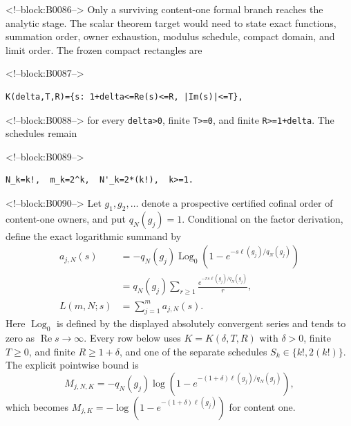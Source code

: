 \documentclass[11pt]{article}
\begin{document}
<!--block:B0086-->
Only a surviving content-one formal branch reaches the analytic stage.
The scalar theorem target would need to state exact functions, summation
order, owner exhaustion, modulus schedule, compact domain, and limit
order. The frozen compact rectangles are

<!--block:B0087-->
\begin{verbatim}
K(delta,T,R)={s: 1+delta<=Re(s)<=R, |Im(s)|<=T},
\end{verbatim}

<!--block:B0088-->
for every \texttt{delta\textgreater{}0}, finite
\texttt{T\textgreater{}=0}, and finite \texttt{R\textgreater{}=1+delta}.
The schedules remain

<!--block:B0089-->
\begin{verbatim}
N_k=k!,  m_k=2^k,  N'_k=2*(k!),  k>=1.
\end{verbatim}

<!--block:B0090-->
Let \(g_1,g_2,\ldots\) denote a prospective certified cofinal order of
content-one owners, and put \(q_N(g_j)=1\).  Conditional on the factor derivation,
define the exact logarithmic summand by
\[
 \begin{aligned}
 a_{j,N}(s)
 &=-q_N(g_j)\operatorname{Log}_0
 \!\left(1-e^{-s\ell(g_j)/q_N(g_j)}\right)\\
 &=q_N(g_j)\sum_{r\geq1}
 \frac{e^{-rs\ell(g_j)/q_N(g_j)}}{r},\\
 L(m,N;s)&=\sum_{j=1}^m a_{j,N}(s).
 \end{aligned}
\]
Here \(\operatorname{Log}_0\) is defined by the displayed absolutely convergent
series and tends to zero as \(\operatorname{Re}s\to\infty\).  Every row below
uses
\(K=K(\delta,T,R)\) with \(\delta>0\), finite \(T\geq0\), and finite
\(R\geq1+\delta\), and one of the separate schedules
\(S_k\in\{k!,2(k!)\}\).  The explicit pointwise bound is
\[
 M_{j,N,K}=-q_N(g_j)\log\!\left(1-e^{-(1+\delta)\ell(g_j)/q_N(g_j)}\right),
\]
which becomes \(M_{j,K}=-\log(1-e^{-(1+\delta)\ell(g_j)})\) for content one.
\end{document}
